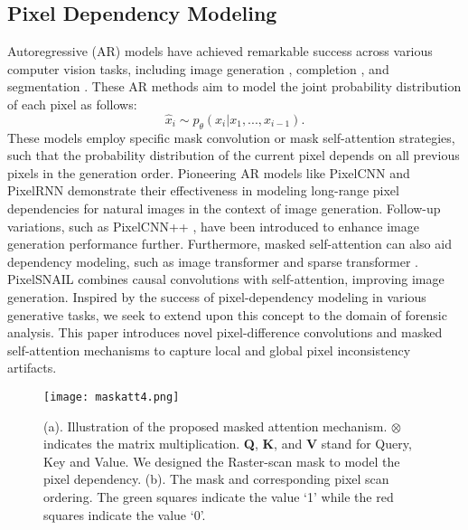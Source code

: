 \documentclass[10pt,journal,compsoc]{IEEEtran}
\begin{document}
\subsection{Pixel Dependency Modeling}
Autoregressive (AR) models \cite{larochelle2011neural, germain2015made, van2016conditional, salimans2017pixelcnn++, parmar2018image, chen2018pixelsnail, child2019generating} have achieved remarkable success across various computer vision tasks, including image generation \cite{germain2015made, van2016conditional, kolesnikov2017pixelcnn}, completion \cite{chen2018pixelsnail, jain2020locally, parmar2018image}, and segmentation \cite{ouali2020autoregressive}. These AR methods aim to model the joint probability distribution of each pixel as follows:
\begin{equation}
     {\hat{x}_{i}} \sim p_{\theta}(x_{i}|x_{1},...,x_{i-1}).
\end{equation}
These models employ specific mask convolution or mask self-attention strategies, such that the probability distribution of the current pixel depends on all previous pixels in the generation order. Pioneering AR models like PixelCNN \cite{van2016conditional} and PixelRNN \cite{van2016pixel} demonstrate their effectiveness in modeling long-range pixel dependencies for natural images in the context of image generation. Follow-up variations, such as PixelCNN++ \cite{salimans2017pixelcnn++}, have been introduced to enhance image generation performance further. Furthermore, masked self-attention can also aid dependency modeling, such as image transformer \cite{parmar2018image} and sparse transformer \cite{child2019generating}. PixelSNAIL \cite{chen2018pixelsnail} combines causal convolutions with self-attention, improving image generation. Inspired by the success of pixel-dependency modeling in various generative tasks, we seek to extend upon this concept to the domain of forensic analysis. This paper introduces novel pixel-difference convolutions and masked self-attention mechanisms to capture local and global pixel inconsistency artifacts. 

\begin{figure}[ht]
\centering
\texttt{[image:  maskatt4.png]}
\caption{(a). Illustration of the proposed masked attention mechanism. $\otimes$ indicates the matrix multiplication. \textbf{Q}, \textbf{K}, and \textbf{V} stand for Query, Key and Value. We designed the Raster-scan mask to model the pixel dependency. (b). The mask and corresponding pixel scan ordering. The green squares indicate the value `1' while the red squares indicate the value `0'.}
\label{maskatt}
\end{figure}
\end{document}
